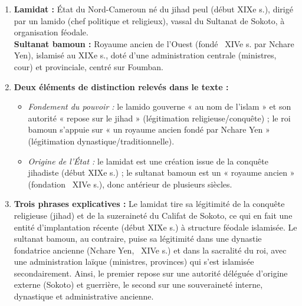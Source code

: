 \documentclass[11pt]{article}
\newcommand{\cle}[1]{{\popxbold\color{popdark}#1}}
\begin{document}
\begin{corrige}
\begin{enumerate}
\item \textbf{Lamidat :} État du Nord-Cameroun né du jihad peul (début XIXe s.), dirigé par un \cle{lamido} (chef politique et religieux), vassal du Sultanat de Sokoto, à organisation féodale.\\
\textbf{Sultanat bamoun :} Royaume ancien de l'Ouest (fondé ~XIVe s. par Nchare Yen), islamisé au XIXe s., doté d'une administration centrale (ministres, cour) et provinciale, centré sur Foumban.

\item \textbf{Deux éléments de distinction relevés dans le texte :}
\begin{itemize}
\item \textit{Fondement du pouvoir :} le lamido gouverne « au nom de l'islam » et son autorité « repose sur le jihad » (légitimation religieuse/conquête) ; le roi bamoun s'appuie sur « un royaume ancien fondé par Nchare Yen » (légitimation dynastique/traditionnelle).
\item \textit{Origine de l'État :} le lamidat est une création issue de la conquête jihadiste (début XIXe s.) ; le sultanat bamoun est un « royaume ancien » (fondation ~XIVe s.), donc antérieur de plusieurs siècles.
\end{itemize}

\item \textbf{Trois phrases explicatives :}
Le lamidat tire sa légitimité de la conquête religieuse (jihad) et de la suzeraineté du Califat de Sokoto, ce qui en fait une entité d'implantation récente (début XIXe s.) à structure féodale islamisée. Le sultanat bamoun, au contraire, puise sa légitimité dans une dynastie fondatrice ancienne (Nchare Yen, ~XIVe s.) et dans la sacralité du roi, avec une administration laïque (ministres, provinces) qui s'est islamisée secondairement. Ainsi, le premier repose sur une autorité déléguée d'origine externe (Sokoto) et guerrière, le second sur une souveraineté interne, dynastique et administrative ancienne.
\end{enumerate}
\end{corrige}
\end{document}

